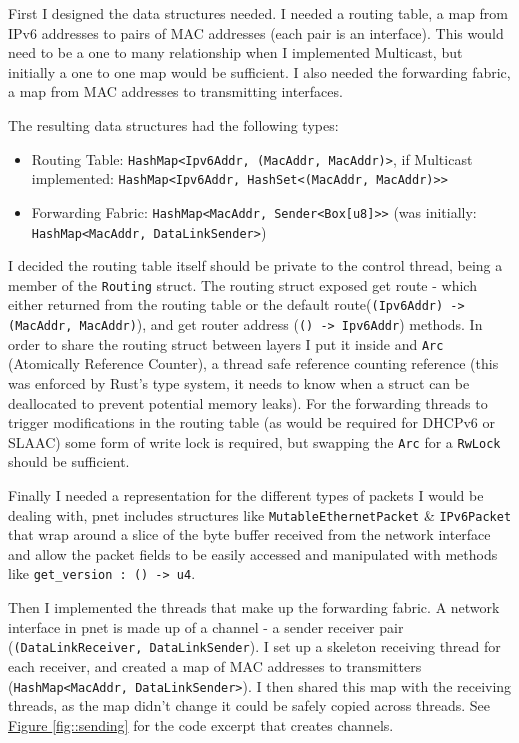 \documentclass[12pt,a4paper,twoside,openright]{report}
\begin{document}
\bigskip

First I designed the data structures needed.  I needed a routing table, a map from IPv6 addresses to pairs of MAC addresses (each pair is an interface). This would need to be a one to many relationship when I implemented Multicast, but initially a one to one map would be sufficient.  I also needed the forwarding fabric, a map from MAC addresses to transmitting interfaces.

The resulting data structures had the following types:
\begin{itemize}
\item Routing Table: \verb!HashMap<Ipv6Addr, (MacAddr, MacAddr)>!, if Multicast implemented: \verb!HashMap<Ipv6Addr, HashSet<(MacAddr, MacAddr)>>!
\item Forwarding Fabric: \verb!HashMap<MacAddr, Sender<Box[u8]>>! (was initially: \verb!HashMap<MacAddr, DataLinkSender>!)
\end{itemize}
I decided the routing table itself should be private to the control thread, being a member of the \verb!Routing! struct.  The routing struct exposed get route - which either returned from the routing table or the default route(\verb!(Ipv6Addr) -> (MacAddr, MacAddr)!), and get router address (\verb!() -> Ipv6Addr!) methods. In order to share the routing struct between layers I put it inside and \verb!Arc! (Atomically Reference Counter\cite{rust_arc}), a thread safe reference counting reference (this was enforced by Rust's type system, it needs to know when a struct can be deallocated to prevent potential memory leaks).  For the forwarding threads to trigger modifications in the routing table (as would be required for DHCPv6 or SLAAC) some form of write lock is required, but swapping the \verb!Arc! for a \verb!RwLock!\cite{rust_rwlock} should be sufficient.

Finally I needed a representation for the different types of packets I would be dealing with, pnet\cite{4} includes structures like \verb!MutableEthernetPacket! \& \verb!IPv6Packet! that wrap around a slice of the byte buffer received from the network interface and allow the packet fields to be easily accessed and manipulated with methods like \verb!get_version : () -> u4!.

\bigskip

Then I implemented the threads that make up the forwarding fabric.  A network interface in pnet is made up of a channel - a sender receiver pair (\verb!(DataLinkReceiver, DataLinkSender!). I set up a skeleton receiving thread for each receiver, and created a map of MAC addresses to transmitters (\verb!HashMap<MacAddr, DataLinkSender>!).  I then shared this map with the receiving threads, as the map didn't change it could be safely copied across threads. See \hyperref[fig::sending]{Figure }\ref{fig::sending} for the code excerpt that creates channels.
\end{document}
